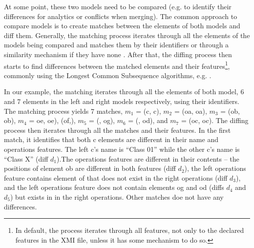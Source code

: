 \documentclass{llncs}
\begin{document}
At some point, these two models need to be compared (e.g. to identify their differences for analytics or conflicts when merging). The common approach to compare models is to create matches between the elements of both models and diff them. Generally, the matching process iterates through all the elements of the models being compared and matches them by their identifiers or through a similarity mechanism if they have none \cite{DBLP:conf/sfm/BroschKLSWW12,emfcompare2018developer}. After that, the diffing process then starts to find differences between the matched elements and their features\footnote{In default, the process iterates through all features, not only to the declared features in the XMI file, unless it has some mechanism to do so.}, commonly using the Longest Common Subsequence algorithms, e.g. \cite{DBLP:journals/algorithmica/Meyers86}. 

In our example, the matching iterates through all the elements of both model, 6 and 7 elements in the left and right models respectively, using their identifiers. The matching process yields 7 matches, $m_1$ = (\textsf{c}, \textsf{c}), $m_2$ = (\textsf{oa}, \textsf{oa}), $m_3$ = (\textsf{ob}, \textsf{ob}), $m_4$ = {\textsf{oe}, \textsf{oe}), (\textsf{of},), $m_5$ = (, \textsf{og}), $m_6$ = (, \textsf{od}), and $m_7$ = (\textsf{oc}, \textsf{oc}). The diffing process then iterates through all the matches and their features. In the first match, it identifies that both \textsf{c} elements are different in their \textsf{name} and \textsf{operations} features. The left \textsf{c}'s \textsf{name} is ``Class 01'' while the other \textsf{c}'s \textsf{name} is ``Class X'' (diff $d_1$).The \textsf{operations} features are different in their contents -- the positions of element \textsf{ob} are different in both features (diff $d_2$), the left \textsf{operations} feature contains element \textsf{of} that does not exist in the right \textsf{operations} (diff $d_3$}), and the left \textsf{operations} feature does not contain elements \textsf{og} and \textsf{od} (diffs $d_4$ and $d_5$) but exists in in the right \textsf{operations}. Other matches doe not have any differences.
\end{document}
